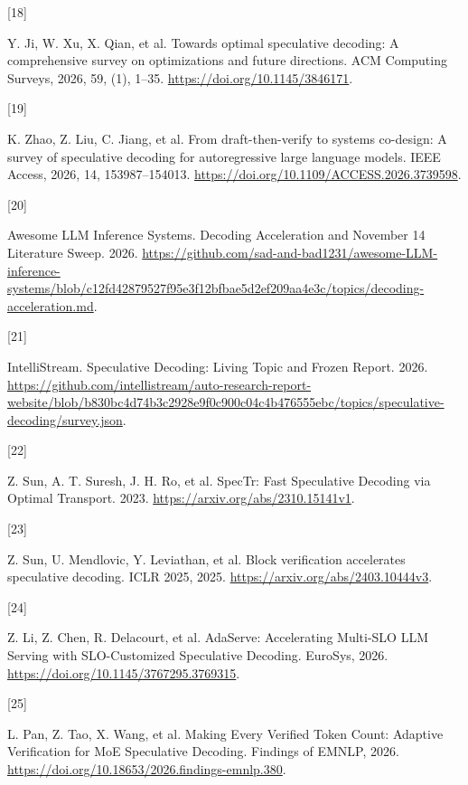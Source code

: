\documentclass[
  a4paper,
  UTF8,
  fontset=none,
  zihao=5]{ctexart}
\newlength{\cslhangindent}
\newlength{\csllabelwidth}
\newenvironment{CSLReferences}[2] %
 {\begin{list}{}{%
  \setlength{\itemindent}{0pt}
  \setlength{\leftmargin}{0pt}
  \setlength{\parsep}{0pt}
  \ifodd #1
   \setlength{\leftmargin}{\cslhangindent}
   \setlength{\itemindent}{-1\cslhangindent}
  \fi
  \setlength{\itemsep}{#2\baselineskip}}}
 {\end{list}}
\newcommand{\CSLLeftMargin}[1]{\parbox[t]{\csllabelwidth}{\strut#1\strut}}
\newcommand{\CSLRightInline}[1]{\parbox[t]{\linewidth - \csllabelwidth}{\strut#1\strut}}
\begin{document}
\begin{CSLReferences}{0}{0}
\CSLLeftMargin{{[}18{]} }%
\CSLRightInline{Y. Ji, W. Xu, X. Qian, et al. Towards optimal
speculative decoding: A comprehensive survey on optimizations and future
directions. ACM Computing Surveys, 2026, 59, (1), 1--35.
\url{https://doi.org/10.1145/3846171}.}

\CSLLeftMargin{{[}19{]} }%
\CSLRightInline{K. Zhao, Z. Liu, C. Jiang, et al. From draft-then-verify
to systems co-design: A survey of speculative decoding for
autoregressive large language models. IEEE Access, 2026, 14,
153987--154013. \url{https://doi.org/10.1109/ACCESS.2026.3739598}.}

\CSLLeftMargin{{[}20{]} }%
\CSLRightInline{Awesome LLM Inference Systems. {Decoding Acceleration
and November 14 Literature Sweep}. 2026.
\url{https://github.com/sad-and-bad1231/awesome-LLM-inference-systems/blob/c12fd42879527f95e3f12bfbae5d2ef209aa4e3c/topics/decoding-acceleration.md}.}

\CSLLeftMargin{{[}21{]} }%
\CSLRightInline{IntelliStream. {Speculative Decoding: Living Topic and
Frozen Report}. 2026.
\url{https://github.com/intellistream/auto-research-report-website/blob/b830bc4d74b3c2928e9f0c900c04c4b476555ebc/topics/speculative-decoding/survey.json}.}

\CSLLeftMargin{{[}22{]} }%
\CSLRightInline{Z. Sun, A. T. Suresh, J. H. Ro, et al. {SpecTr: Fast
Speculative Decoding via Optimal Transport}. 2023.
\url{https://arxiv.org/abs/2310.15141v1}.}

\CSLLeftMargin{{[}23{]} }%
\CSLRightInline{Z. Sun, U. Mendlovic, Y. Leviathan, et al. Block
verification accelerates speculative decoding. ICLR 2025, 2025.
\url{https://arxiv.org/abs/2403.10444v3}.}

\CSLLeftMargin{{[}24{]} }%
\CSLRightInline{Z. Li, Z. Chen, R. Delacourt, et al. {AdaServe:
Accelerating Multi-SLO LLM Serving with SLO-Customized Speculative
Decoding}. EuroSys, 2026.
\url{https://doi.org/10.1145/3767295.3769315}.}

\CSLLeftMargin{{[}25{]} }%
\CSLRightInline{L. Pan, Z. Tao, X. Wang, et al. {Making Every Verified
Token Count: Adaptive Verification for MoE Speculative Decoding}.
Findings of EMNLP, 2026.
\url{https://doi.org/10.18653/2026.findings-emnlp.380}.}


\end{CSLReferences}
\end{document}
